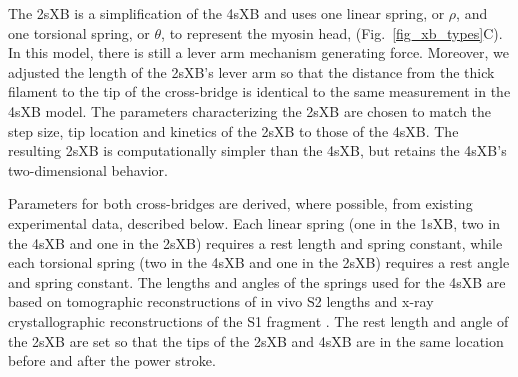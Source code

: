 \documentclass[]{article}
\begin{document}
The 2sXB is a simplification of the 4sXB and uses one linear spring, or $\rho$, and one torsional spring, or $\theta$, to represent the myosin head, (Fig.~\ref{fig_xb_types}C).
In this model, there is still a lever arm mechanism generating force.  
Moreover, we adjusted the length of the 2sXB's lever arm so that the distance from the thick filament to the tip of the cross-bridge is identical to the same measurement in the 4sXB model.
The parameters characterizing the 2sXB are chosen to match the step size, tip location and kinetics of the 2sXB to those of the 4sXB\@. 
The resulting 2sXB is computationally simpler than the 4sXB, but retains the 4sXB's two-dimensional behavior.

Parameters for both cross-bridges are derived, where possible, from existing experimental data, described below.  
Each linear spring (one in the 1sXB, two in the 4sXB and one in the 2sXB) requires a rest length and spring constant, while each torsional spring (two in the 4sXB and one in the 2sXB) requires a rest angle and spring constant.
The lengths and angles of the springs used for the 4sXB are based on tomographic reconstructions of in vivo S2 lengths and x-ray crystallographic reconstructions of the S1 fragment \citep{Taylor1999, Rayment1993}.
The rest length and angle of the 2sXB are set so that the tips of the 2sXB and 4sXB are in the same location before and after the power stroke.
\end{document}
